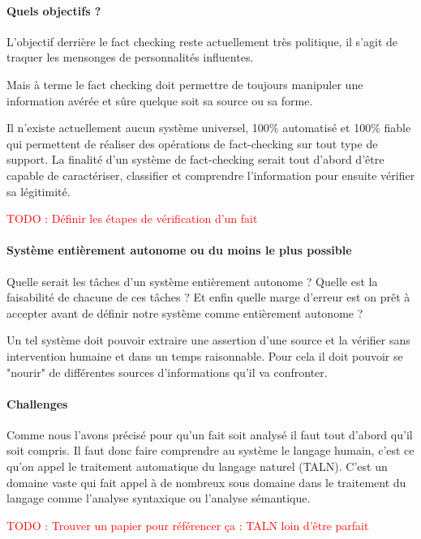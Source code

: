 \documentclass[12pt]{article}
\newcommand\todo[1]{\textcolor{red}{TODO : #1}}
\begin{document}
\paragraph{Quels objectifs ?}

L'objectif derrière le fact checking reste actuellement très politique, il s'agit de traquer les mensonges de personnalités influentes.

Mais à terme le fact checking doit permettre de toujours manipuler une information avérée et sûre quelque soit sa source ou sa forme.

Il n'existe actuellement aucun système universel, 100\% automatisé et 100\% fiable qui permettent de réaliser des opérations de fact-checking sur tout type de support. La finalité d'un système de fact-checking serait tout d'abord d'être capable de caractériser, classifier et comprendre l'information pour ensuite vérifier sa légitimité. 

\todo{Définir les étapes de vérification d'un fait}

\paragraph{Système entièrement autonome ou du moins le plus possible}

Quelle serait les tâches d'un système entièrement autonome ? Quelle est la faisabilité de chacune de ces tâches ? Et enfin quelle marge d'erreur est on prêt à accepter avant de définir notre système comme entièrement autonome ?

Un tel système doit pouvoir extraire une assertion d'une source et la vérifier sans intervention humaine et dans un temps raisonnable. Pour cela il doit pouvoir se "nourir" de différentes sources d'informations qu'il va confronter.

\paragraph{Challenges}

Comme nous l'avons précisé pour qu'un fait soit analysé il faut tout d'abord qu'il soit compris. Il faut donc faire comprendre au système le langage humain, c'est ce qu'on appel le traitement automatique du langage naturel (TALN). C'est un domaine vaste qui fait appel à de nombreux sous domaine dans le traitement du langage comme l'analyse syntaxique ou l'analyse sémantique.

\todo{Trouver un papier pour référencer ça : TALN loin d'être parfait}
\end{document}
